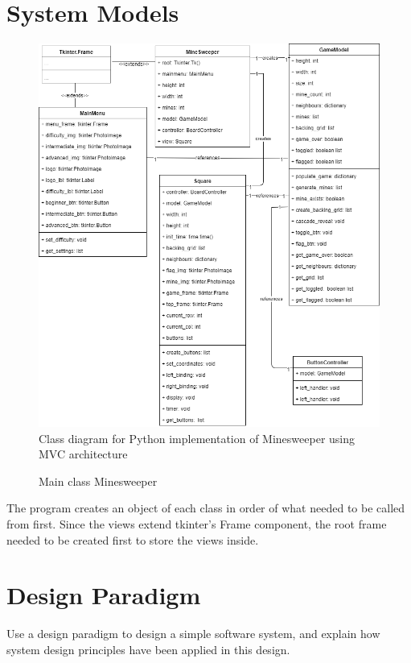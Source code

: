 \documentclass[12pt, a4]{report}
\begin{document}
	\section{System Models}

	\begin{figure}
		\centering
		\includegraphics[scale=0.5]{classdiagram}
		\caption{Class diagram for Python implementation of Minesweeper using MVC architecture}
	\end{figure}
	\pagebreak
	
	\begin{figure}[h]
		
		\caption{Main class Minesweeper}
	\end{figure}

	\par The program creates an object of each class in order of what needed to be called from first. Since the views extend tkinter's Frame component, the root frame needed to be created first to store the views inside. 

	\section{Design Paradigm}
	Use a design paradigm to design a simple software system, and explain how system design principles have been applied in this design.
	\par 
\end{document}
